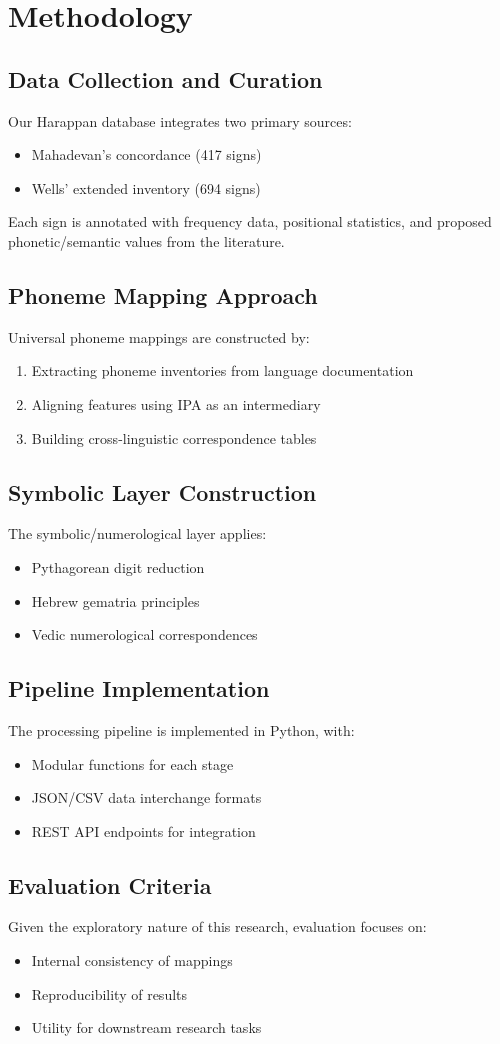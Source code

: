 \section{Methodology}
\label{sec:methodology}

\subsection{Data Collection and Curation}
Our Harappan database integrates two primary sources:
\begin{itemize}
  \item Mahadevan's concordance (417 signs)
  \item Wells' extended inventory (694 signs)
\end{itemize}

Each sign is annotated with frequency data, positional statistics,
and proposed phonetic/semantic values from the literature.

\subsection{Phoneme Mapping Approach}
Universal phoneme mappings are constructed by:
\begin{enumerate}
  \item Extracting phoneme inventories from language documentation
  \item Aligning features using IPA as an intermediary
  \item Building cross-linguistic correspondence tables
\end{enumerate}

\subsection{Symbolic Layer Construction}
The symbolic/numerological layer applies:
\begin{itemize}
  \item Pythagorean digit reduction
  \item Hebrew gematria principles
  \item Vedic numerological correspondences
\end{itemize}

\subsection{Pipeline Implementation}
The processing pipeline is implemented in Python, with:
\begin{itemize}
  \item Modular functions for each stage
  \item JSON/CSV data interchange formats
  \item REST API endpoints for integration
\end{itemize}

\subsection{Evaluation Criteria}
Given the exploratory nature of this research, evaluation focuses on:
\begin{itemize}
  \item Internal consistency of mappings
  \item Reproducibility of results
  \item Utility for downstream research tasks
\end{itemize}
